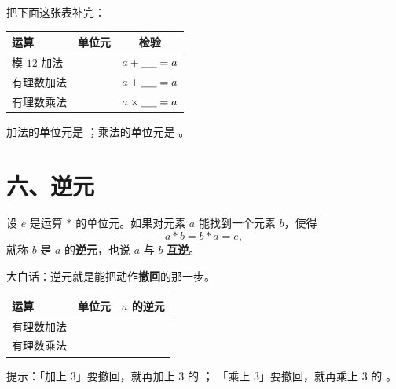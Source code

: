 \begin{dongshou}[单位元不止 \(0\) 一个]
  把下面这张表补完：
  \begin{center}
  \begin{tabular}{@{}lcc@{}}
    \toprule
    运算 & 单位元 & 检验 \\
    \midrule
    模 \(12\) 加法 & \hspace{1.8em} & \(a+\underline{\hspace{1.4em}}=a\) \\
    有理数加法 & \hspace{1.8em} & \(a+\underline{\hspace{1.4em}}=a\) \\
    有理数乘法 & \hspace{1.8em} & \(a\times\underline{\hspace{1.4em}}=a\) \\
    \bottomrule
  \end{tabular}
  \end{center}
  加法的单位元是 \underline{\hspace{2.2em}}；乘法的单位元是 \underline{\hspace{2.2em}}。
\end{dongshou}

\section*{六、逆元}

\begin{definition}[逆元]
  设 \(e\) 是运算 \(*\) 的单位元。如果对元素 \(a\) 能找到一个元素 \(b\)，使得
  \[
    a*b=b*a=e,
  \]
  就称 \(b\) 是 \(a\) 的\textbf{逆元}，也说 \(a\) 与 \(b\) \textbf{互逆}。
\end{definition}

\noindent 大白话：逆元就是能把动作\textbf{撤回}的那一步。

\begin{dongshou}[逆元，你们早就在用了]
  \begin{center}
  \begin{tabular}{@{}lcc@{}}
    \toprule
    运算 & 单位元 & \(a\) 的逆元 \\
    \midrule
    有理数加法 & \hspace{1.8em} & \hspace{4em} \\
    有理数乘法 & \hspace{1.8em} & \hspace{4em} \\
    \bottomrule
  \end{tabular}
  \end{center}
  提示：「加上 \(3\)」要撤回，就再加上 \(3\) 的 \underline{\hspace{2.8em}}；
  「乘上 \(3\)」要撤回，就再乘上 \(3\) 的 \underline{\hspace{2.8em}}。
\end{dongshou}


